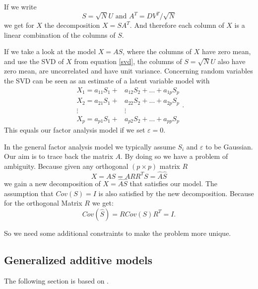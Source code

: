 \documentclass[12pt, a4paper]{article}
\numberwithin{equation}{section}
\numberwithin{figure}{section}
\numberwithin{table}{section}
\begin{document}
	If we write
	\begin{equation} 
	S=\sqrt{N}U \text{ and } A^T=DV^T/\sqrt{N}
	\end{equation}
	we get for \mbox{$X$} the decomposition \mbox{$X=SA^T$.}
	And therefore each column of $X$ is a linear combination of the columns of \mbox{$S$}.
	
	If we take a look at the model \mbox{$X=AS$}, where the columns of \mbox{$X$} have zero mean, and use the SVD of \mbox{$X$} from equation \ref{svd}, the columns of \mbox{$S=\sqrt{N}U$} also have zero mean, are uncorrelated and have unit variance.
	Concerning random variables the SVD can be seen as an estimate of a latent variable model with
	\begin{equation}
	\begin{split}
	X_1 = a_{11}S_1+&a_{12}S_2+\dots+a_{1p}S_p\\
	X_2 = a_{21}S_1+&a_{22}S_2+\dots+a_{2p}S_p\\
	\vdots \hspace{2cm}& \vdots\\
	X_p = a_{p1}S_1+&a_{p2}S_2+\dots+a_{pp}S_p
	\end{split}.
	\end{equation}
	This equals our factor analysis model if we set \mbox{$\varepsilon=0$}.
	
	In the general factor analysis model we typically assume \mbox{$S_i$} and \mbox{$\varepsilon$} to be Gaussian.
	Our aim is to trace back the matrix \mbox{$A$}.
	By doing so we have a problem of ambiguity.
	Because given any orthogonal \mbox{$(p \times p)$} matrix $R$
	\begin{equation}
	X = AS = ARR^TS = \hat{A}\hat{S}
	\end{equation}
	we gain a new decomposition of \mbox{$X= \hat{A}\hat{S}$} that satisfies our model.
	The assumption that \mbox{$Cov(S)=I$} is also satisfied by the new decomposition.
	Because for the orthogonal Matrix $R$ we get:
	\begin{equation}
	Cov(\hat{S})=RCov(S)R^T=I.
	\end{equation}
	
	So we need some additional constraints to make the problem more unique. %
	
	\subsection{Generalized additive models} \label{additivemodels}
	The following section is based on \citet{elementsofstatisticallearning}.
	
\end{document}
